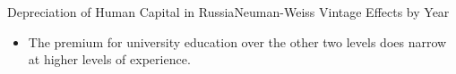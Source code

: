 \documentclass{beamer}
\begin{document}
\begin{frame}{Depreciation of Human Capital in Russia}{Neuman-Weiss Vintage Effects by Year}
	\begin{figure}
		\centering
		\hfill
		\hfill
	\end{figure}
	\begin{itemize}
		\item The premium for university education over the other two levels does narrow at higher levels of experience.
	\end{itemize}
\end{frame}
\end{document}
